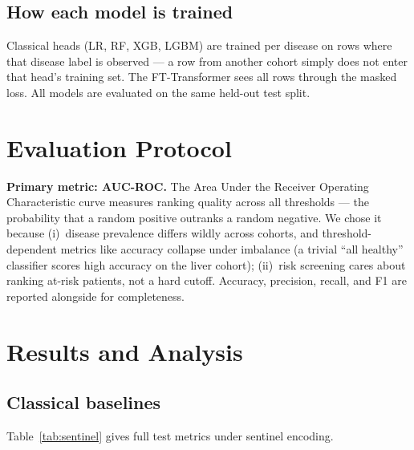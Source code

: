 \documentclass[journal]{IEEEtran}
\begin{document}
\subsection{How each model is trained}
Classical heads (LR, RF, XGB, LGBM) are trained per disease on rows where that disease label is observed --- a row from another cohort simply does not enter that head's training set. The FT-Transformer sees all rows through the masked loss. All models are evaluated on the same held-out test split.

\section{Evaluation Protocol}
\textbf{Primary metric: AUC-ROC.} The Area Under the Receiver Operating Characteristic curve measures ranking quality across all thresholds --- the probability that a random positive outranks a random negative. We chose it because (i)~disease prevalence differs wildly across cohorts, and threshold-dependent metrics like accuracy collapse under imbalance (a trivial ``all healthy'' classifier scores high accuracy on the liver cohort); (ii)~risk screening cares about ranking at-risk patients, not a hard cutoff. Accuracy, precision, recall, and F1 are reported alongside for completeness.

\section{Results and Analysis}
\subsection{Classical baselines}
Table~\ref{tab:sentinel} gives full test metrics under sentinel encoding.
\end{document}
